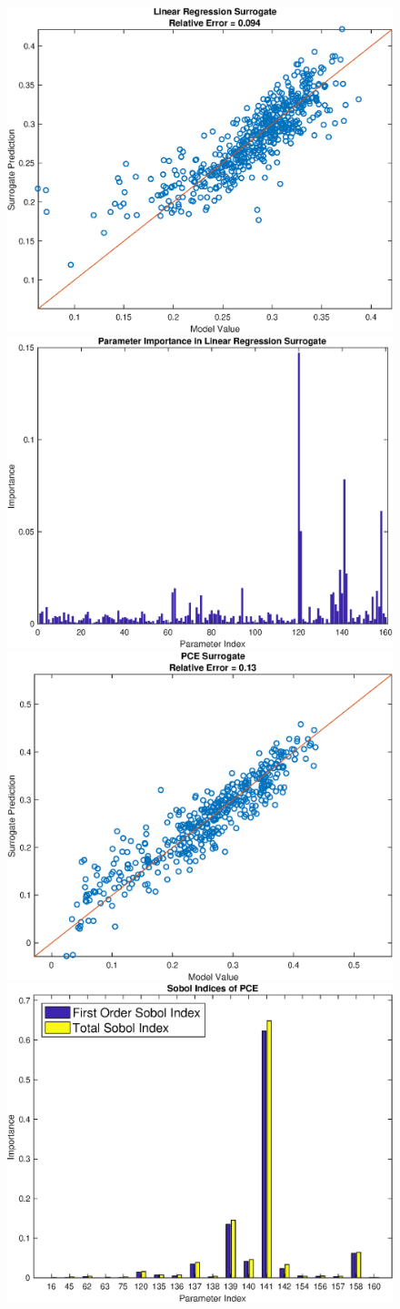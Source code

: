 \documentclass[12pt]{article}
\numberwithin{equation}{section}
\begin{document}
\begin{figure}[h]
\centering
\includegraphics[width=.49 \textwidth]{Figures/AM_AMp_Min_QoI_LR_Prediction_Experimental.eps}
\includegraphics[width=.49 \textwidth]{Figures/AM_AMp_Min_QoI_LR_VI_Experimental.eps}\\
\includegraphics[width=.49 \textwidth]{Figures/AM_AMp_Min_QoI_PCE_Prediction_Experimental.eps}
\includegraphics[width=.49 \textwidth]{Figures/AM_AMp_Min_QoI_PCE_SI_Experimental.eps}
\end{figure}
\end{document}
